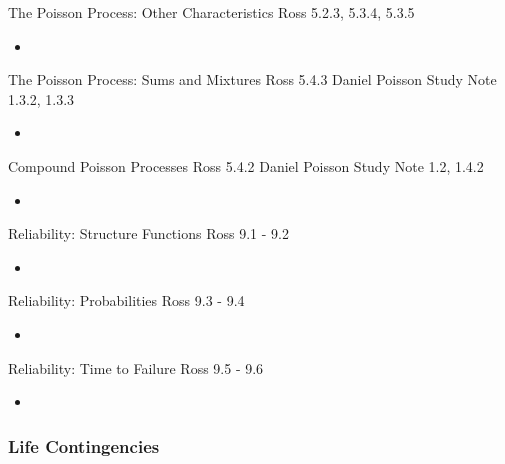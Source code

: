 \documentclass[12pt, titlepage, french]{report}
\begin{document}
\begin{CHPT_SUMM_AUTO_NUMB}[label = {L.-14}]{The Poisson Process: Other Characteristics}
Ross 5.2.3, 5.3.4, 5.3.5
	\begin{itemize}
		\item	
	\end{itemize}
\end{CHPT_SUMM_AUTO_NUMB}

\begin{CHPT_SUMM_AUTO_NUMB}[label = {L.-15}]{The Poisson Process: Sums and Mixtures}
Ross 5.4.3
Daniel Poisson Study Note 1.3.2, 1.3.3
	\begin{itemize}
		\item	
	\end{itemize}
\end{CHPT_SUMM_AUTO_NUMB}

\begin{CHPT_SUMM_AUTO_NUMB}[label = {L.-16}]{Compound Poisson Processes}
Ross 5.4.2
Daniel Poisson Study Note 1.2, 1.4.2
	\begin{itemize}
		\item	
	\end{itemize}
\end{CHPT_SUMM_AUTO_NUMB}

\begin{CHPT_SUMM_AUTO_NUMB}[label = {L.-17}]{Reliability: Structure Functions}
Ross 9.1 - 9.2
	\begin{itemize}
		\item	
	\end{itemize}
\end{CHPT_SUMM_AUTO_NUMB}

\begin{CHPT_SUMM_AUTO_NUMB}[label = {L.-18}]{Reliability: Probabilities}
Ross 9.3 - 9.4
	\begin{itemize}
		\item	
	\end{itemize}
\end{CHPT_SUMM_AUTO_NUMB}

\begin{CHPT_SUMM_AUTO_NUMB}[label = {L.-19}]{Reliability: Time to Failure}
Ross 9.5 - 9.6
	\begin{itemize}
		\item	
	\end{itemize}
\end{CHPT_SUMM_AUTO_NUMB}

\subsubsection*{Life Contingencies}
\end{document}
